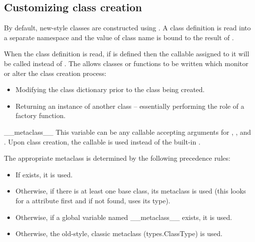 \subsection{Customizing class creation\label{metaclasses}}

By default, new-style classes are constructed using .
A class definition is read into a separate namespace and the value
of class name is bound to the result of .

When the class definition is read, if  is defined
then the callable assigned to it will be called instead of .
The allows classes or functions to be written which monitor or alter the class
creation process:

\begin{itemize}
\item Modifying the class dictionary prior to the class being created.
\item Returning an instance of another class -- essentially performing
the role of a factory function.
\end{itemize}

\begin{datadesc}{__metaclass__}
This variable can be any callable accepting arguments for ,
, and .  Upon class creation, the callable is
used instead of the built-in .
\end{datadesc}

The appropriate metaclass is determined by the following precedence rules:

\begin{itemize}

\item If  exists, it is used.

\item Otherwise, if there is at least one base class, its metaclass is used
(this looks for a  attribute first and if not found, uses its
type).

\item Otherwise, if a global variable named __metaclass__ exists, it is used.

\item Otherwise, the old-style, classic metaclass (types.ClassType) is used.

\end{itemize}      


